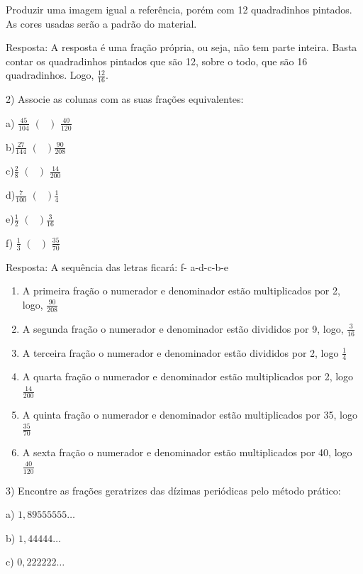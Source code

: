 Produzir uma imagem igual a referência, porém com 12 quadradinhos
pintados. As cores usadas serão a padrão do material.

Resposta: A resposta é uma fração própria, ou seja, não tem parte
inteira. Basta contar os quadradinhos pintados que são 12, sobre o todo,
que são 16 quadradinhos. Logo, \(\frac{12}{16}\).

2) Associe as colunas com as suas frações equivalentes:

a) \(\frac{45}{104}\) \(\left( \text{\ \ \ \ } \right)\)
\(\frac{40}{120}\)

b)\(\frac{27}{144}\) \(\left( \text{\ \ \ \ \ } \right)\frac{90}{208}\)

c)\(\frac{2}{8}\) \(\left( \text{\ \ \ \ \ \ } \right)\)
\(\frac{14}{200}\)

d)\(\frac{7}{100}\) \(\left( \text{\ \ \ \ \ \ } \right)\frac{1}{4}\)

e)\(\frac{1}{2}\) \(\left( \text{\ \ \ \ \ \ } \right)\frac{3}{16}\)

f) \(\frac{1}{3}\) \(\left( \text{\ \ \ \ \ \ \ } \right)\)
\(\frac{35}{70}\)

Resposta: A sequência das letras ficará: f- a-d-c-b-e

\begin{enumerate}
\def\labelenumi{\alph{enumi})}
\item
  A primeira fração o numerador e denominador estão multiplicados por 2,
  logo, \(\frac{90}{208}\)
\item
  A segunda fração o numerador e denominador estão divididos por 9,
  logo, \(\frac{3}{16}\)
\item
  A terceira fração o numerador e denominador estão divididos por 2,
  logo \(\frac{1}{4}\)
\item
  A quarta fração o numerador e denominador estão multiplicados por 2,
  logo \(\frac{14}{200}\)
\item
  A quinta fração o numerador e denominador estão multiplicados por 35,
  logo\(\frac{35}{70}\)
\item
  A sexta fração o numerador e denominador estão multiplicados por 40,
  logo \(\frac{40}{120}\)
\end{enumerate}

3) Encontre as frações geratrizes das dízimas periódicas pelo método
prático:

a) \(1,89555555\ldots\)

b) \(1,44444\ldots\)

c) \(0,222222\ldots\)

